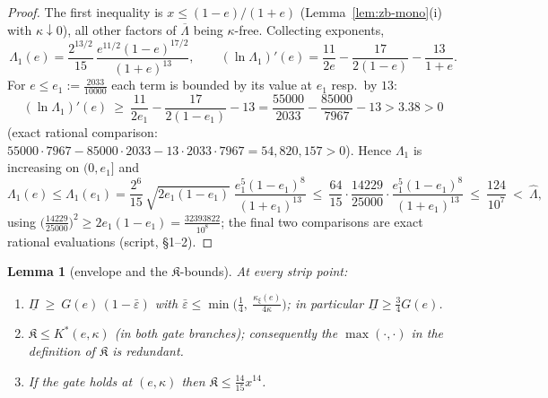 \documentclass[11pt]{article}
\newtheorem{lemma}[theorem]{Lemma}
\theoremstyle{remark}
\theoremstyle{plain}
\theoremstyle{plain}
\newcommand{\eps}{\varepsilon}
\newcommand{\Kfrak}{\mathfrak K}
\newcommand{\Kstar}{K^{*}}
\newcommand{\kxi}{\kappa_\xi}
\newcommand{\epsbar}{\bar\eps}
\begin{document}
\begin{proof}
The first inequality is $x\le(1-e)/(1+e)$ (Lemma~\ref{lem:zb-mono}(i) with
$\kappa\downarrow0$), all other factors of $\overline\Lambda$ being
$\kappa$-free.  Collecting exponents,
\[
        \Lambda_1(e)=\frac{2^{13/2}}{15}\,
        \frac{e^{11/2}(1-e)^{17/2}}{(1+e)^{13}},
        \qquad
        (\ln\Lambda_1)'(e)=\frac{11}{2e}-\frac{17}{2(1-e)}-\frac{13}{1+e}.
\]
For $e\le e_1:=\tfrac{2033}{10000}$ each term is bounded by its value at
$e_1$ resp.\ by $13$:
\[
        (\ln\Lambda_1)'(e)\ \ge\ \frac{11}{2e_1}-\frac{17}{2(1-e_1)}-13
        =\frac{55000}{2033}-\frac{85000}{7967}-13>3.38>0
\]
(exact rational comparison: $55000\cdot7967-85000\cdot2033-13\cdot2033\cdot
7967=54{,}820{,}157>0$).  Hence $\Lambda_1$ is increasing on $(0,e_1]$ and
\[
        \Lambda_1(e)\le\Lambda_1(e_1)
        =\frac{2^6}{15}\,\sqrt{2e_1(1-e_1)}\;
        \frac{e_1^5(1-e_1)^8}{(1+e_1)^{13}}
        \ \le\ \frac{64}{15}\cdot\frac{14229}{25000}\cdot
        \frac{e_1^5(1-e_1)^8}{(1+e_1)^{13}}
        \ \le\ \frac{124}{10^7}\ <\ \widehat\Lambda,
\]
using $\bigl(\tfrac{14229}{25000}\bigr)^2\ge2e_1(1-e_1)
=\tfrac{32393822}{10^8}$; the final two comparisons are exact rational
evaluations (script, \S1--2).
\end{proof}

\begin{lemma}[envelope and the $\Kfrak$-bounds]\label{lem:zb-envelope}
At every strip point:
\begin{enumerate}[label=\textup{(\alph*)},itemsep=1pt]
\item $\underline\Pi\ \ge\ G(e)\,(1-\epsbar)$ with
$\epsbar\le\min\bigl(\tfrac14,\ \tfrac{\kxi(e)}{4\kappa}\bigr)$;
in particular $\underline\Pi\ge\tfrac34G(e)$.
\item $\Kfrak\le\Kstar(e,\kappa)$ (in both gate branches); consequently the
$\max(\cdot,\cdot)$ in the definition of $\Kfrak$ is redundant.
\item If the gate holds at $(e,\kappa)$ then
$\Kfrak\le\tfrac{14}{15}x^{14}$.
\end{enumerate}
\end{lemma}
\end{document}
